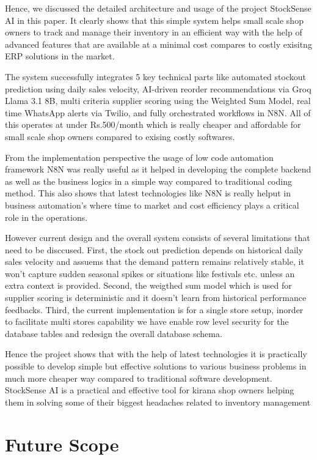 \documentclass[journal]{IEEEtran}
\begin{document}
Hence, we discussed the detailed architecture and usage of the project StockSense AI in this paper. It clearly shows that this simple system helps small scale shop owners to track and manage their inventory in an efficient way with the help of advanced features that are available at a minimal cost compares to costly exisitng ERP solutions in the market.

The system successfully integrates 5 key technical parts like automated stockout prediction using daily sales velocity, AI-driven reorder recommendations via Groq Llama 3.1 8B, multi criteria supplier scoring using the Weighted Sum Model, real time WhatsApp alerts via Twilio, and fully orchestrated workflows in N8N. All of this operates at under Rs.500/month which is really cheaper and affordable for small scale shop owners compared to exising costly softwares.

From the implementation perspective the usage of low code automation framework N8N was really useful as it helped in developing the complete backend as well as the business logics in a simple way compared to traditional coding method. This also shows that latest technologies like N8N is really helput in business automation's where time to market and cost efficiency plays a critical role in the operations.

However current design and the overall system consists of several limitations that need to be disccused. First, the stock out prediction depends on historical daily sales velocity and assuems that the demand pattern remains relatively stable, it won't capture sudden seasonal spikes or situations like festivals etc. unless an extra context is provided. Second, the weigthed sum model which is used for supplier scoring is deterministic and it doesn't learn from historical performance feedbacks. Third, the current implementation is for a single store setup, inorder to facilitate multi stores capability we have enable row level security for the database tables and redesign the overall database schema.

Hence the project shows that with the help of latest technologies it is practically possible to develop simple but effective solutions to various business problems in much more cheaper way compared to traditional software development. StockSense AI is a practical and effective tool for kirana shop owners helping them in solving some of their biggest headaches related to inventory management

\section{Future Scope}
\end{document}
